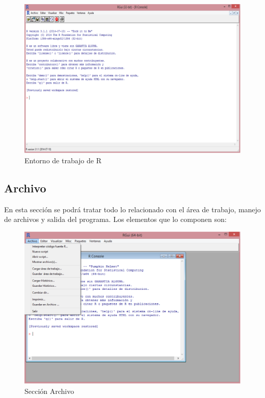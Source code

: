 \documentclass[11pt,a4paper,oneside]{book}\usepackage[]{graphicx}\usepackage[]{color}
\begin{document}
\begin{figure}[H]
\centering
\includegraphics[scale=.4]{figuras/console.eps}
\caption{Entorno de trabajo de R}
\label{entorno}
\end{figure}


\subsection{Archivo}

En esta sección se podrá tratar todo lo relacionado con el área de trabajo, manejo de archivos y salida del programa. Los elementos que lo componen son:
  \begin{figure}[H]
  \centering
  \includegraphics[scale=.4]{figuras/archivo.eps}
  \caption{Sección Archivo}
  \label{archivo}
  \end{figure}
\end{document}

